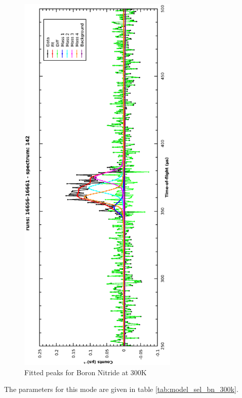 \documentclass[a4paper]{article}
\begin{document}
\begin{figure}[h!]
  \centering
  \vspace{-60pt}
  \begin{turn}{-90}
    \includegraphics[width=0.68\textwidth]{graphics/model_sel_bn_300k.eps}
  \end{turn}
  \vspace{-60pt}
  \caption{Fitted peaks for Boron Nitride at 300K}
  \label{fig:model_sel_bn_300k}
\end{figure}
\FloatBarrier

The parameters for this mode are given in table \ref{tab:model_sel_bn_300k}.
\end{document}
